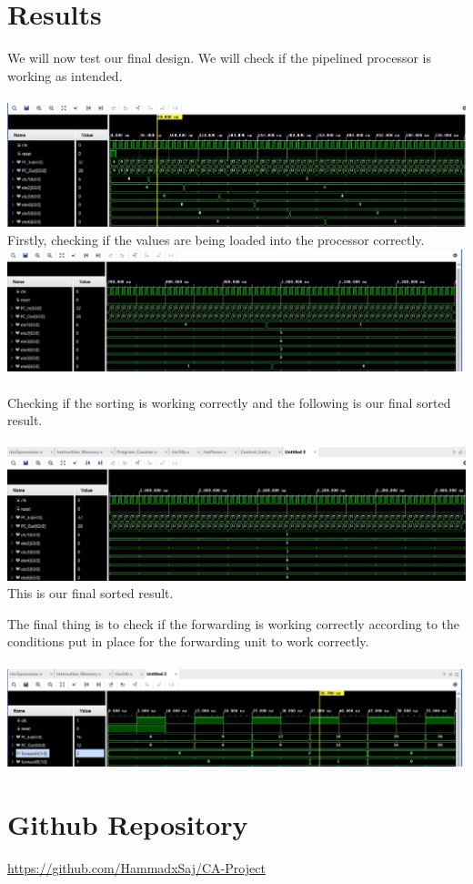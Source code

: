\documentclass{article}
\begin{document}
\section{Results}
We will now test our final design. We will check if the pipelined processor is working as intended. 
\\ \\
\includegraphics*[width = 13 cm]{loadingvalues.jpeg}
\\
Firstly, checking if the values are being loaded into the processor correctly. 
\\
\includegraphics*[width = 13 cm]{firstsorting.jpeg}
\\ \\
Checking if the sorting is working correctly and the following is our final sorted result. 
\\ \\
\includegraphics*[width = 13 cm]{final_sorted.jpeg}
This is our final sorted result.

The final thing is to check if the forwarding is working correctly according to the conditions put in place for the forwarding unit to work correctly.
\\ \\
\includegraphics*[width = 13 cm]{forwarding.jpeg}

\section{Github Repository}

\href{https://github.com/HammadxSaj/CA-Project}{https://github.com/HammadxSaj/CA-Project}
\end{document}
